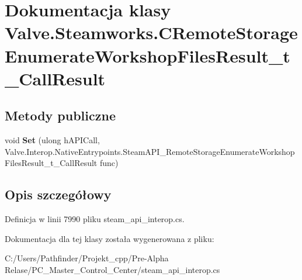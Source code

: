 \hypertarget{class_valve_1_1_steamworks_1_1_c_remote_storage_enumerate_workshop_files_result__t___call_result}{}\section{Dokumentacja klasy Valve.\+Steamworks.\+C\+Remote\+Storage\+Enumerate\+Workshop\+Files\+Result\+\_\+t\+\_\+\+Call\+Result}
\label{class_valve_1_1_steamworks_1_1_c_remote_storage_enumerate_workshop_files_result__t___call_result}
\subsection*{Metody publiczne}
\begin{DoxyCompactItemize}
\item 
\mbox{\label{class_valve_1_1_steamworks_1_1_c_remote_storage_enumerate_workshop_files_result__t___call_result_a6e2f9b886e82e08a5c456691ad414439}} 
void {\bfseries Set} (ulong h\+A\+P\+I\+Call, Valve.\+Interop.\+Native\+Entrypoints.\+Steam\+A\+P\+I\+\_\+\+Remote\+Storage\+Enumerate\+Workshop\+Files\+Result\+\_\+t\+\_\+\+Call\+Result func)
\end{DoxyCompactItemize}


\subsection{Opis szczegółowy}


Definicja w linii 7990 pliku steam\+\_\+api\+\_\+interop.\+cs.



Dokumentacja dla tej klasy została wygenerowana z pliku\+:\begin{DoxyCompactItemize}
\item 
C\+:/\+Users/\+Pathfinder/\+Projekt\+\_\+cpp/\+Pre-\/\+Alpha Relase/\+P\+C\+\_\+\+Master\+\_\+\+Control\+\_\+\+Center/steam\+\_\+api\+\_\+interop.\+cs\end{DoxyCompactItemize}
